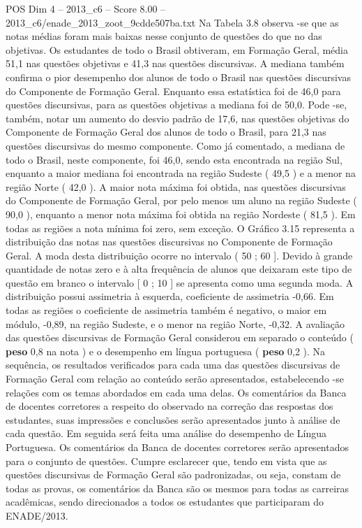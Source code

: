 \begin{textsample}{POS Dim 4 – 2013\_c6 – Score 8.00 – 2013\_c6/enade\_2013\_zoot\_9cdde507ba.txt}
Na Tabela 3.8 observa -se que as notas médias foram mais baixas nesse conjunto de questões do que no das objetivas.
Os estudantes de todo o Brasil obtiveram, em Formação Geral, média 51,1 nas questões objetivas e 41,3 nas questões discursivas.
A mediana também confirma o pior desempenho dos alunos de todo o Brasil nas questões discursivas do Componente de Formação Geral.
Enquanto essa estatística foi de 46,0 para questões discursivas, para as questões objetivas a mediana foi de 50,0.
Pode -se, também, notar um aumento do desvio padrão de 17,6, nas questões objetivas do Componente de Formação Geral dos alunos de todo o Brasil, para 21,3 nas questões discursivas do mesmo componente.
Como já comentado, a mediana de todo o Brasil, neste componente, foi 46,0, sendo esta encontrada na região Sul, enquanto a maior mediana foi encontrada na região Sudeste ( 49,5 ) e a menor na região Norte ( 42,0 ).
A maior nota máxima foi obtida, nas questões discursivas do Componente de Formação Geral, por pelo menos um aluno na região Sudeste ( 90,0 ), enquanto a menor nota máxima foi obtida na região Nordeste ( 81,5 ).
Em todas as regiões a nota mínima foi zero, sem exceção.
O Gráfico 3.15 representa a distribuição das notas nas questões discursivas no Componente de Formação Geral.
A moda desta distribuição ocorre no intervalo ( 50 ; 60 ].
Devido à grande quantidade de notas zero e à alta frequência de alunos que deixaram este tipo de questão em branco o intervalo [ 0 ; 10 ] se apresenta como uma segunda moda.
A distribuição possui assimetria à esquerda, coeficiente de assimetria -0,66.
Em todas as regiões o coeficiente de assimetria também é negativo, o maior em módulo, -0,89, na região Sudeste, e o menor na região Norte, -0,32.
A avaliação das questões discursivas de Formação Geral considerou em separado o conteúdo ( \textbf{peso} 0,8 na nota ) e o desempenho em língua portuguesa ( \textbf{peso} 0,2 ).
Na sequência, os resultados verificados para cada uma das questões discursivas de Formação Geral com relação ao conteúdo serão apresentados, estabelecendo -se relações com os temas abordados em cada uma delas.
Os comentários da Banca de docentes corretores a respeito do observado na correção das respostas dos estudantes, suas impressões e conclusões serão apresentados junto à análise de cada questão.
Em seguida será feita uma análise do desempenho de Língua Portuguesa.
Os comentários da Banca de docentes corretores serão apresentados para o conjunto de questões.
Cumpre esclarecer que, tendo em vista que as questões discursivas de Formação Geral são padronizadas, ou seja, constam de todas as provas, os comentários da Banca são os mesmos para todas as carreiras acadêmicas, sendo direcionados a todos os estudantes que participaram do ENADE/2013.

\end{textsample}
